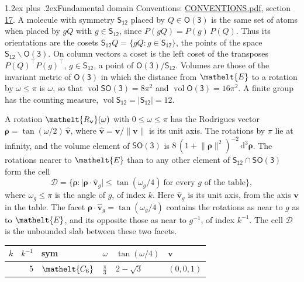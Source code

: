 \documentclass[10pt,a4paper]{article}
\makeatletter
\renewcommand\section{\@startsection{section}{1}{\z@}{-3ex plus -1ex minus -.2ex}%
  {1.2ex plus .2ex}{\normalfont\large\sffamily\bfseries\color{parttitle}}}
\numberwithin{equation}{section}
\newcommand{\eltfont}[1]{{\let\sigma\eltsigma\mathelt{#1}}}
\newcommand{\grp}[1]{\mathsf{#1}}
\newcommand{\cls}[1]{\eltfont{#1}}
\newcommand{\elt}[1]{\eltfont{#1}}
\newcommand{\dirvec}[3]{(#1, #2, #3)}
\newcommand{\unitaxis}{\hat{\mathbf{v}}}
\newcommand{\vv}{\mathbf{v}}
\newcommand{\diff}{\mathrm{d}}
\newcommand{\vol}{\operatorname{vol}}
\newcommand{\rodrigues}{\boldsymbol{\rho}}
\newcommand{\fcell}{\mathcal{D}}
\makeatother
\begin{document}
\section{Fundamental domain}\label{s:fundamental_domain}
Conventions: \href{../../CONVENTIONS.pdf}{CONVENTIONS.pdf}, section \href{../../CONVENTIONS.pdf\#conv.17}{17}.
\leavevmode\label{n:element.placement}A molecule with symmetry $\grp{S_{12}}$ placed by $Q \in \grp{O(3)}$ is the same set of atoms when placed by $gQ$ with $g \in \grp{S_{12}}$, since $P(gQ) = P(g)\,P(Q)$. \label{n:operator.cosets}Thus its orientations are the cosets $\grp{S_{12}}Q = \{gQ : g \in \grp{S_{12}}\}$, the points of the space $\grp{S_{12}}\backslash\grp{O(3)}$. On column vectors a coset is the left coset of the transposes $P(Q)^{\top}P(g)^{\top}$, $g \in \grp{S_{12}}$, a point of $\grp{O(3)}/\grp{S_{12}}$.
\leavevmode\label{n:operator.volume}Volumes are those of the invariant metric of \href{O3.pdf}{$\grp{O(3)}$} in which the distance from $\elt{E}$ to a rotation by $\omega \le \pi$ is $\omega$, so that $\vol\grp{SO(3)} = 8\pi^2$ and $\vol\grp{O(3)} = 16\pi^2$. A finite group has the counting measure, $\vol\grp{S_{12}} = |\grp{S_{12}}| = 12$.

\leavevmode\label{n:vector.rodrigues}\label{n:vector.unitaxis}A rotation $\elt{R_{\vv}}(\omega)$ with $0 \le \omega \le \pi$ has the Rodrigues vector $\rodrigues = \tan(\omega/2)\,\unitaxis$, where $\unitaxis = \vv/\lVert\vv\rVert$ is its unit axis. The rotations by $\pi$ lie at infinity, and the volume element of \href{SO3.pdf}{$\grp{SO(3)}$} is $8\,(1 + \lVert\rodrigues\rVert^2)^{-2}\,\diff^3\rodrigues$.
\leavevmode\label{n:set.cell}The rotations nearer to $\elt{E}$ than to any other element of $\grp{S_{12}} \cap \grp{SO(3)}$ form the cell
\begin{equation}\label{e:cell}\fcell = \bigl\{\rodrigues : \lvert\rodrigues\cdot\unitaxis_g\rvert \le \tan(\omega_g/4)\ \text{for every $g$ of the table}\bigr\},\end{equation}
where $\omega_g \le \pi$ is the angle of $g$, of index $k$. Here $\unitaxis_g$ is its unit axis, from the axis $\vv$ in the table. The facet $\rodrigues\cdot\unitaxis_g = \tan(\omega_g/4)$ contains the rotations as near to $g$ as to $\elt{E}$, and its opposite those as near to $g^{-1}$, of index $k^{-1}$. The cell $\fcell$ is the unbounded slab between these two facets.
{\small{\renewcommand{\arraystretch}{1.3}\begin{longtable}{@{}rrllll@{}}\toprule
$k$ & $k^{-1}$ & sym & $\omega$ & $\tan(\omega/4)$ & $\vv$\\\midrule\endhead
\bottomrule\endfoot\endlastfoot
1 & 5 & $\cls{C_{6}}$ & $\tfrac{\pi}{3}$ & $2 - \sqrt{3}$ & $\dirvec{0}{0}{1}$\\
\bottomrule\end{longtable}}}
\end{document}
